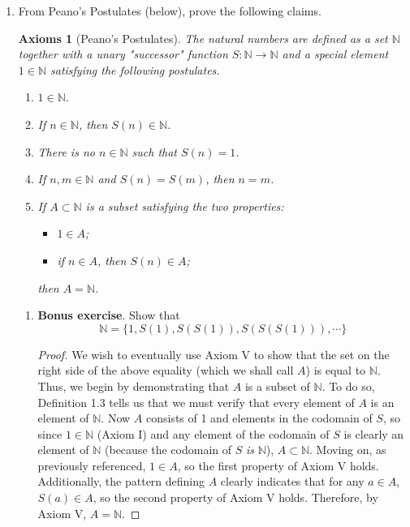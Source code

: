 \documentclass[titlepage]{article}
\newtheorem*{axioms}{Axioms}
\theoremstyle{definition}
\newcommand{\N}{\mathbb{N}}
\begin{document}
\begin{enumerate}
\begin{proof}
\begin{align*}
            &= \sum_{k=0}^{n+1}\binom{n+1}{k}x^{(n+1)-k}y^k
        \end{align*}
        This closes the induction.
    \end{proof}
    \item From Peano's Postulates (below), prove the following claims.
    \begin{axioms}[Peano's Postulates]
        The natural numbers are defined as a set $\N$ together with a unary "successor" function $S:\N\to\N$ and a special element $1\in\N$ satisfying the following postulates.
        \begin{enumerate}[label={\Roman*.}]
            \item $1\in\N$.
            \item If $n\in\N$, then $S(n)\in\N$.
            \item There is no $n\in\N$ such that $S(n)=1$.
            \item If $n,m\in\N$ and $S(n)=S(m)$, then $n=m$.
            \item If $A\subset\N$ is a subset satisfying the two properties:
            \begin{itemize}
                \item $1\in A$;
                \item if $n\in A$, then $S(n)\in A$;
            \end{itemize}
            then $A=\N$.
        \end{enumerate}
    \end{axioms}
    \begin{enumerate}[label={(\alph*)}]
        \item \textbf{Bonus exercise}. Show that
        \begin{equation*}
            \N = \{1,S(1),S(S(1)),S(S(S(1))),\cdots\}
        \end{equation*}
        \begin{proof}
            We wish to eventually use Axiom V to show that the set on the right side of the above equality (which we shall call $A$) is equal to $\N$. Thus, we begin by demonstrating that $A$ is a subset of $\N$. To do so, Definition 1.3 tells us that we must verify that every element of $A$ is an element of $\N$. Now $A$ consists of 1 and elements in the codomain of $S$, so since $1\in\N$ (Axiom I) and any element of the codomain of $S$ is clearly an element of $\N$ (because the codomain of $S$ \emph{is} $\N$), $A\subset\N$. Moving on, as previously referenced, $1\in A$, so the first property of Axiom V holds. Additionally, the pattern defining $A$ clearly indicates that for any $a\in A$, $S(a)\in A$, so the second property of Axiom V holds. Therefore, by Axiom V, $A=\N$.
        \end{proof}
    \end{enumerate}
\end{enumerate}
\end{document}
